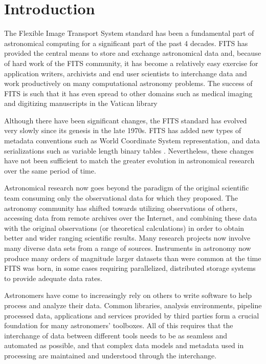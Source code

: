 \documentclass[11pt,twoside]{article}
\begin{document}
\section{Introduction}

The Flexible Image Transport System standard
\citep[FITS;][]{1981A&AS...44..363W,2001A&A...376..359H,2010A&A...524A..42P}
has been a fundamental part of astronomical computing for a
significant part of the past 4 decades. FITS has provided the central
means to store and exchange astronomical data and, because of hard
work of the FITS community, it has become a relatively easy exercise
for application writers, archivists and end user scientists to
interchange data and work productively on many computational astronomy
problems. The success of FITS is such that it has even spread to other
domains such as medical imaging and digitizing manuscripts in the
Vatican library
\citep[ascl:1206.013,][]{2006JRASC.100..242W,2012EWASSAlle}


Although there have been significant changes, the FITS standard has
evolved very slowly since its genesis in the late 1970s. FITS has
added new types of metadata conventions such as World Coordinate
System
\citep[WCS;][]{2002A&A...395.1061G,2002A&A...395.1077C,2006A&A...446..747G}
representation, and data serializations such as variable length binary
tables \citep{1995A&AS..113..159C}. Nevertheless, these changes have
not been sufficient to match the greater evolution in astronomical
research over the same period of time.

Astronomical research now goes beyond the paradigm of the original
scientific team consuming only the observational data for which they
proposed. The astronomy community has shifted towards utilizing
observations of others, accessing data from remote archives over the
Internet, and combining these data with the original observations (or
theoretical calculations) in order to obtain better and wider ranging
scientific results. Many research projects now involve many diverse
data sets from a range of sources. Instruments in astronomy now
produce many orders of magnitude larger datasets than were common at
the time FITS was born, in some cases
\citep[e.g.][]{2012ASPC..461..283A} requiring parallelized,
distributed storage systems to provide adequate data rates.

Astronomers have come to increasingly rely on others to write software
to help process and analyze their data. Common libraries, analysis
environments, pipeline processed data, applications and services
provided by third parties form a crucial foundation for many
astronomers' toolboxes. All of this requires that the interchange of
data between different tools needs to be as seamless and automated as
possible, and that complex data models and metadata used in processing
are maintained and understood through the interchange.
\end{document}

